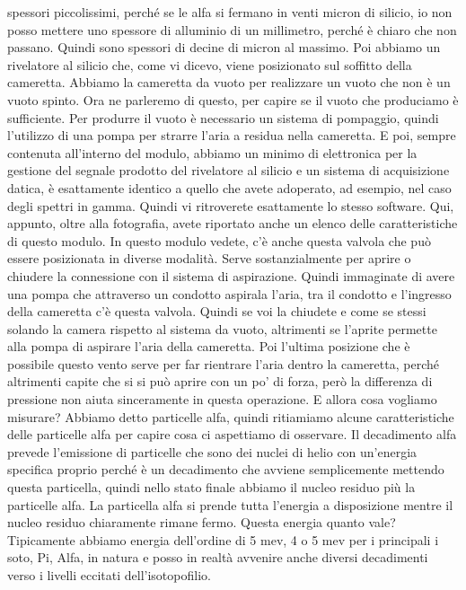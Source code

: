 spessori piccolissimi, perché se le alfa si fermano in venti micron di silicio, io non posso mettere uno spessore di alluminio di un millimetro, perché è chiaro che non passano. Quindi sono spessori di decine di micron al massimo. Poi abbiamo un rivelatore al silicio che, come vi dicevo, viene posizionato sul soffitto della cameretta. Abbiamo la cameretta da vuoto per realizzare un vuoto che non è un vuoto spinto. Ora ne parleremo di questo, per capire se il vuoto che produciamo è sufficiente. Per produrre il vuoto è necessario un sistema di pompaggio, quindi l'utilizzo di una pompa per strarre l'aria a residua nella cameretta. E poi, sempre contenuta all'interno del modulo, abbiamo un minimo di elettronica per la gestione del segnale prodotto del rivelatore al silicio e un sistema di acquisizione datica, è esattamente identico a quello che avete adoperato, ad esempio, nel caso degli spettri in gamma. Quindi vi ritroverete esattamente lo stesso software. Qui, appunto, oltre alla fotografia, avete riportato anche un elenco delle caratteristiche di questo modulo. In questo modulo vedete, c'è anche questa valvola che può essere posizionata in diverse modalità. Serve sostanzialmente per aprire o chiudere la connessione con il sistema di aspirazione. Quindi immaginate di avere una pompa che attraverso un condotto aspirala l'aria, tra il condotto e l'ingresso della cameretta c'è questa valvola. Quindi se voi la chiudete e come se stessi solando la camera rispetto al sistema da vuoto, altrimenti se l'aprite permette alla pompa di aspirare l'aria della cameretta. Poi l'ultima posizione che è possibile questo vento serve per far rientrare l'aria dentro la cameretta, perché altrimenti capite che si si può aprire con un po' di forza, però la differenza di pressione non aiuta sinceramente in questa operazione. E allora cosa vogliamo misurare? Abbiamo detto particelle alfa, quindi ritiamiamo alcune caratteristiche delle particelle alfa per capire cosa ci aspettiamo di osservare. Il decadimento alfa prevede l'emissione di particelle che sono dei nuclei di helio con un'energia specifica proprio perché è un decadimento che avviene semplicemente mettendo questa particella, quindi nello stato finale abbiamo il nucleo residuo più la particelle alfa. La particella alfa si prende tutta l'energia a disposizione mentre il nucleo residuo chiaramente rimane fermo. Questa energia quanto vale? Tipicamente abbiamo energia dell'ordine di 5 mev, 4 o 5 mev per i principali i soto, Pi, Alfa, in natura e posso in realtà avvenire anche diversi decadimenti verso i livelli eccitati dell'isotopofilio. 

